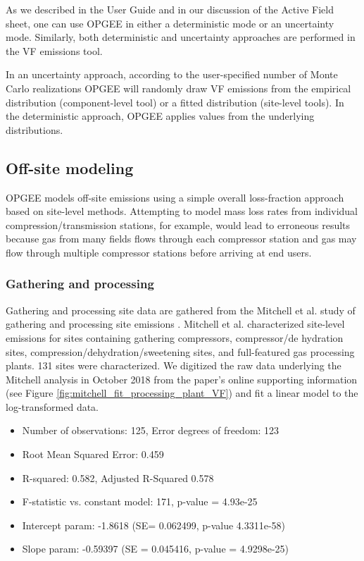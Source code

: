\documentclass[11pt]{report}
\begin{document}
As we described in the User Guide and in our discussion of the Active Field sheet, one can use OPGEE in either a deterministic mode or an uncertainty mode. Similarly, both deterministic and uncertainty approaches are performed in the VF emissions tool. 

In an uncertainty approach, according to the user-specified number of Monte Carlo realizations OPGEE will randomly draw VF emissions from the empirical distribution (component-level tool) or a fitted distribution (site-level tools). In the deterministic approach, OPGEE applies values from the underlying distributions.

\subsection{Off-site modeling}

OPGEE models off-site emissions using a simple overall loss-fraction approach based on site-level methods. Attempting to model mass loss rates from individual compression/transmission stations, for example, would lead to erroneous results because gas from many fields flows through each compressor station and gas may flow through multiple compressor stations before arriving at end users.

\subsubsection{Gathering and processing}
Gathering and processing site data are gathered from the Mitchell et al. study of gathering and processing site emissions \cite{Mitchell2015}. Mitchell et al. characterized site-level emissions for sites containing gathering compressors, compressor/de hydration sites, compression/dehydration/sweetening sites, and full-featured gas processing plants. 131 sites were characterized. We digitized the raw data underlying the Mitchell analysis in October 2018 from the paper's online supporting information (see Figure \ref{fig:mitchell_fit_processing_plant_VF}) and fit a linear model to the log-transformed data. 
\begin{itemize}
\item	Number of observations: 125, Error degrees of freedom: 123
\item	Root Mean Squared Error: 0.459
\item	R-squared: 0.582, Adjusted R-Squared 0.578
\item 	F-statistic vs. constant model: 171, p-value = 4.93e-25
\item	Intercept param: -1.8618 (SE= 0.062499, p-value 4.3311e-58)
\item	Slope param: -0.59397 (SE = 0.045416, p-value = 4.9298e-25)
\end{itemize}
\end{document}
